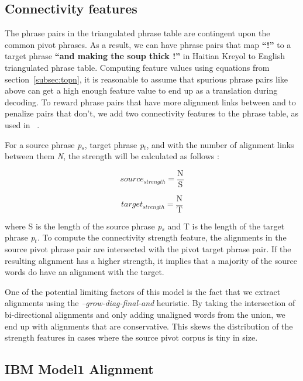 \subsection{Connectivity features}
\label{subsec:connectivity}
        The phrase pairs in the triangulated phrase table are contingent upon the common pivot phrases. As a result, we can have phrase pairs that map \textbf{``!''} to a target phrase \textbf{``and making the soup thick !''} in Haitian Kreyol to English triangulated phrase table. Computing feature values using equations from section~\ref{subsec:topn}, it is reasonable to assume that spurious phrase pairs like above can get a high enough feature value to end up as a translation during decoding. To reward phrase pairs that have more alignment links between and to penalize pairs that don't, we add two connectivity features to the phrase table, as used in ~\cite{Ahmed:13}.

        For a source phrase \emph{p$_s$}, target phrase \emph{p$_t$}, and with the number of alignment links between them \emph{N}, the strength will be calculated as follows :

        \begin{equation*}
                source_{strength} = \frac{\mathrm{N}}{\mathrm{S}}
        \end{equation*}

        \begin{equation*}
                target_{strength} = \frac{\mathrm{N}}{\mathrm{T}}
        \end{equation*}

        where S is the length of the source phrase \emph{p$_s$} and T is the length of the target phrase \emph{p$_t$}. To compute the connectivity strength feature, the alignments in the source pivot phrase pair are intersected with the pivot target phrase pair. If the resulting alignment has a higher strength, it implies that a majority of the source words do have an alignment with the target. 

        One of the potential limiting factors of this model is the fact that we extract alignments using the \emph{--grow-diag-final-and} heuristic. By taking the intersection of bi-directional alignments and only adding unaligned words from the union, we end up with alignments that are conservative. This skews the distribution of the strength features in cases where the source pivot corpus is tiny in size. 
 

\subsection{IBM Model1 Alignment}
\label{subsec:model1}

